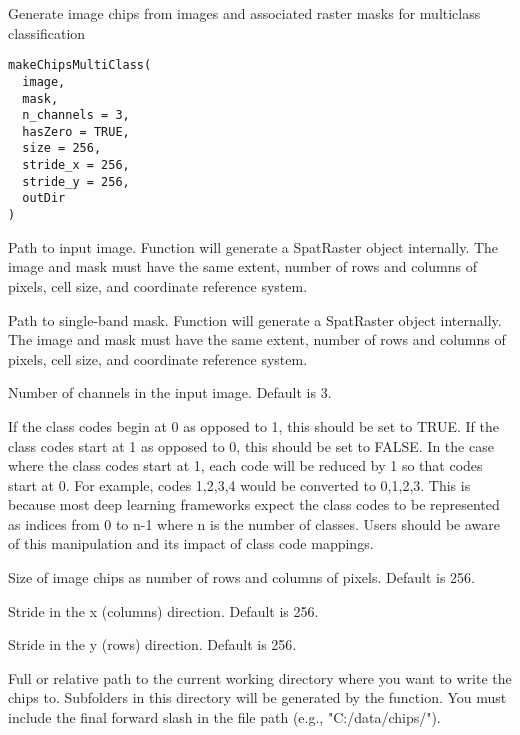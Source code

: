 \documentclass[a4paper]{book}
\begin{document}
%
\begin{Description}\relax
Generate image chips from images and associated raster masks for multiclass classification
\end{Description}
%
\begin{Usage}
\begin{verbatim}
makeChipsMultiClass(
  image,
  mask,
  n_channels = 3,
  hasZero = TRUE,
  size = 256,
  stride_x = 256,
  stride_y = 256,
  outDir
)
\end{verbatim}
\end{Usage}
%
\begin{Arguments}
\begin{ldescription}
\item[\code{image}] Path to input image. Function will generate a SpatRaster object
internally. The image and mask must have the same extent, number of rows and
columns of pixels, cell size, and coordinate reference system.

\item[\code{mask}] Path to single-band mask. Function will generate a SpatRaster
object internally. The image and mask must have the same extent, number of
rows and columns of pixels, cell size, and coordinate reference system.

\item[\code{n\_channels}] Number of channels in the input image. Default is 3.

\item[\code{hasZero}] If the class codes begin at 0 as opposed to 1, this should be
set to TRUE. If the class codes start at 1 as opposed to 0, this should be set
to FALSE. In the case where the class codes start at 1, each code will be
reduced by 1 so that codes start at 0. For example, codes 1,2,3,4 would be
converted to 0,1,2,3. This is because most deep learning frameworks expect the
class codes to be represented as indices from 0 to n-1 where n is the number
of classes. Users should be aware of this manipulation and its impact of class
code mappings.

\item[\code{size}] Size of image chips as number of rows and columns of pixels.
Default is 256.

\item[\code{stride\_x}] Stride in the x (columns) direction. Default is 256.

\item[\code{stride\_y}] Stride in the y (rows) direction. Default is 256.

\item[\code{outDir}] Full or relative path to the current working directory where you
want to write the chips to. Subfolders in this directory will be generated by
the function. You must include the final forward slash in the file path
(e.g., "C:/data/chips/").
\end{ldescription}
\end{Arguments}
\end{document}

